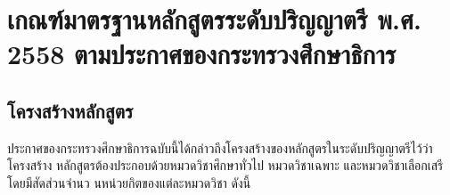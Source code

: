 
\section{เกณฑ์มาตรฐานหลักสูตรระดับปริญญาตรี พ.ศ. 2558 ตามประกาศของกระทรวงศึกษาธิการ}
\subsection{โครงสร้างหลักสูตร}
ประกาศของกระทรวงศึกษาธิการฉบับนี้ได้กล่าวถึงโครงสร้างของหลักสูตรในระดับปริญญาตรีไว้ว่า โครงสร้าง
หลักสูตรต้องประกอบด้วยหมวดวิชาศึกษาทั่วไป หมวดวิชาเฉพาะ และหมวดวิชาเลือกเสรี โดยมีสัดส่วนจํานว
นหน่วยกิตของแต่ละหมวดวิชา ดังนี้
